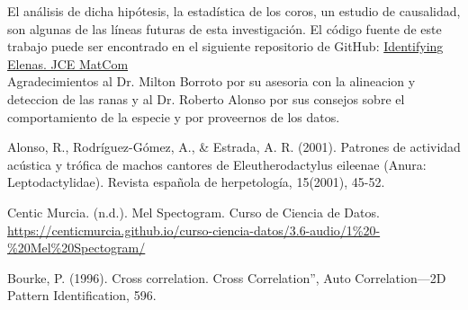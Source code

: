 \documentclass[a4paper,10pt,twocolumn]{article}
\begin{document}
El análisis de dicha hipótesis, la estadística de los coros,
un estudio de causalidad, son algunas de las líneas futuras de esta investigación. 
El código fuente de este trabajo puede ser encontrado en el siguiente repositorio de GitHub:
\href{https://github.com/DanielMPMatCom/Identifying-Elenas.-JCE-MatCom.git}{Identifying Elenas. JCE MatCom}\\


Agradecimientos al Dr. Milton Borroto por su asesoria con la alineacion y deteccion de las ranas y al Dr. Roberto Alonso por sus consejos sobre el comportamiento de la especie y por proveernos de los datos.

\begin{thebibliography}{}
	
	 Alonso, R., Rodríguez-Gómez, A., \& Estrada, A. R. (2001). Patrones de actividad acústica y trófica de machos cantores de Eleutherodactylus eileenae (Anura: Leptodactylidae). Revista española de herpetología, 15(2001), 45-52.

	
	 Centic Murcia. (n.d.). Mel Spectogram. Curso de Ciencia de Datos. \href{https://centicmurcia.github.io/curso-ciencia-datos/3.6-audio/1\%20-\%20Mel\%20Spectogram/}{https://centicmurcia.github.io/curso-ciencia-datos/3.6-audio/1\%20-\%20Mel\%20Spectogram/}
	
	\sloppypar
	 Bourke, P. (1996). Cross correlation. Cross Correlation”, Auto Correlation—2D Pattern Identification, 596.
  

\end{thebibliography}
	  




\label{end}
\end{document}
